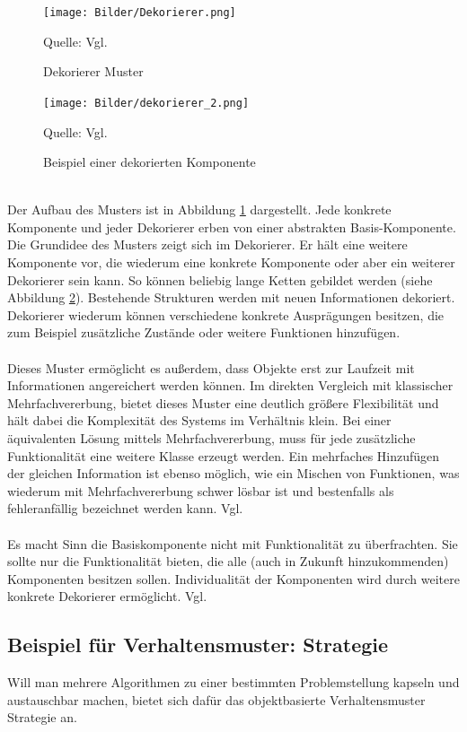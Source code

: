 \documentclass[fontsize=11pt,a4paper,final]{scrreprt}[2003/01/01]
\newcommand*{\quelle}{%
	\footnotesize Quelle: 
}
\begin{document}
\begin{figure}[H]
	\centering
	\texttt{[image: Bilder/Dekorierer.png]}
	\caption{Dekorierer Muster}
	\quelle{ Vgl. \cite[S. 201]{gamma2004}}
	\label{fig:Dekorierer}
\end{figure}

\begin{figure}[H]
	\centering
	\texttt{[image: Bilder/dekorierer\_2.png]}
	\caption{Beispiel einer dekorierten Komponente}
	\quelle{Vgl. \cite[S. 205]{gamma2004}} 
	\label{fig:Beispiel einer dekorierten Komponente}
\end{figure}
\ \\
Der Aufbau des Musters ist in Abbildung \ref{fig:Dekorierer} dargestellt. Jede konkrete Komponente und jeder Dekorierer erben von einer abstrakten Basis-Komponente. Die Grundidee des Musters zeigt sich im Dekorierer. Er hält eine weitere Komponente vor, die wiederum eine konkrete Komponente oder aber ein weiterer Dekorierer sein kann. So können beliebig lange Ketten gebildet werden (siehe Abbildung \ref{fig:Beispiel einer dekorierten Komponente}). Bestehende Strukturen werden mit neuen Informationen \glqq dekoriert\grqq. Dekorierer wiederum können verschiedene konkrete Ausprägungen besitzen, die zum Beispiel zusätzliche Zustände oder weitere Funktionen hinzufügen.
\\ \\
Dieses Muster ermöglicht es außerdem, dass Objekte erst zur Laufzeit mit Informationen angereichert werden können. Im direkten Vergleich mit klassischer Mehrfachvererbung, bietet dieses Muster eine deutlich größere Flexibilität und hält dabei die Komplexität des Systems im Verhältnis klein. Bei einer äquivalenten Lösung mittels Mehrfachvererbung, muss für jede zusätzliche Funktionalität eine weitere Klasse erzeugt werden. Ein mehrfaches Hinzufügen der gleichen Information ist ebenso möglich, wie ein Mischen von Funktionen, was wiederum mit Mehrfachvererbung schwer lösbar ist und bestenfalls als fehleranfällig bezeichnet werden kann. Vgl. \cite[S. 203]{gamma2004}
\\ \\
Es macht Sinn die Basiskomponente nicht mit Funktionalität zu überfrachten. Sie sollte nur die Funktionalität bieten, die alle (auch in Zukunft hinzukommenden) Komponenten besitzen sollen. Individualität der Komponenten wird durch weitere konkrete Dekorierer ermöglicht. Vgl. \cite[S. 203 - 204]{gamma2004}

\subsection{Beispiel für Verhaltensmuster: Strategie}
Will man mehrere Algorithmen zu einer bestimmten Problemstellung kapseln und austauschbar machen, bietet sich dafür das objektbasierte Verhaltensmuster Strategie an.
\end{document}
